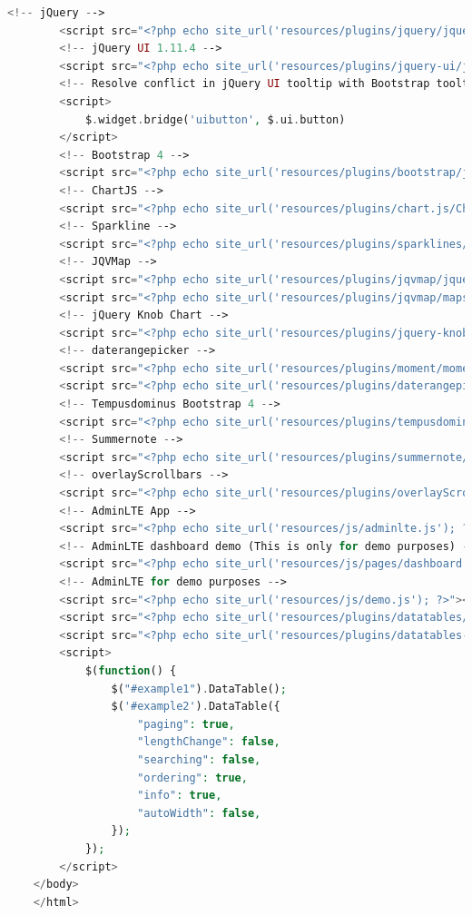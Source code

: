 \begin{lstlisting}[language=PHP]
	    <!-- jQuery -->  
	    <script src="<?php echo site_url('resources/plugins/jquery/jquery.min.js'); ?>"></script>  
	    <!-- jQuery UI 1.11.4 -->  
	    <script src="<?php echo site_url('resources/plugins/jquery-ui/jquery-ui.min.js'); ?>"></script>  
	    <!-- Resolve conflict in jQuery UI tooltip with Bootstrap tooltip -->  
	    <script>  
	        $.widget.bridge('uibutton', $.ui.button)  
	    </script>  
	    <!-- Bootstrap 4 -->  
	    <script src="<?php echo site_url('resources/plugins/bootstrap/js/bootstrap.bundle.min.js'); ?>"></script> 
	    <!-- ChartJS -->  
	    <script src="<?php echo site_url('resources/plugins/chart.js/Chart.min.js'); ?>"></script>  
	    <!-- Sparkline -->  
	    <script src="<?php echo site_url('resources/plugins/sparklines/sparkline.js'); ?>"></script>  
	    <!-- JQVMap -->  
	    <script src="<?php echo site_url('resources/plugins/jqvmap/jquery.vmap.min.js'); ?>"></script>  
	    <script src="<?php echo site_url('resources/plugins/jqvmap/maps/jquery.vmap.usa.js'); ?>"></script>  
	    <!-- jQuery Knob Chart -->  
	    <script src="<?php echo site_url('resources/plugins/jquery-knob/jquery.knob.min.js'); ?>"></script>  
	    <!-- daterangepicker -->  
	    <script src="<?php echo site_url('resources/plugins/moment/moment.min.js'); ?>"></script>  
	    <script src="<?php echo site_url('resources/plugins/daterangepicker/daterangepicker.js'); ?>"></script>  
	    <!-- Tempusdominus Bootstrap 4 -->  
	    <script src="<?php echo site_url('resources/plugins/tempusdominus-bootstrap-4/js/tempusdominus-bootstrap-4.min.js'); ?>"></script>  
	    <!-- Summernote -->  
	    <script src="<?php echo site_url('resources/plugins/summernote/summernote-bs4.min.js'); ?>"></script>  
	    <!-- overlayScrollbars -->  
	    <script src="<?php echo site_url('resources/plugins/overlayScrollbars/js/jquery.overlayScrollbars.min.js'); ?>"></script>  
	    <!-- AdminLTE App -->  
	    <script src="<?php echo site_url('resources/js/adminlte.js'); ?>"></script>  
	    <!-- AdminLTE dashboard demo (This is only for demo purposes) -->  
	    <script src="<?php echo site_url('resources/js/pages/dashboard.js'); ?>"></script>  
	    <!-- AdminLTE for demo purposes -->  
	    <script src="<?php echo site_url('resources/js/demo.js'); ?>"></script>  
	    <script src="<?php echo site_url('resources/plugins/datatables/jquery.dataTables.js'); ?>"></script>  
	    <script src="<?php echo site_url('resources/plugins/datatables-bs4/js/dataTables.bootstrap4.js'); ?>"></script>  
	    <script>  
	        $(function() {  
	            $("#example1").DataTable();  
	            $('#example2').DataTable({  
	                "paging": true,  
	                "lengthChange": false,  
	                "searching": false,  
	                "ordering": true,  
	                "info": true,  
	                "autoWidth": false,  
	            });  
	        });  
	    </script>
	</body>
	</html>
\end{lstlisting}

